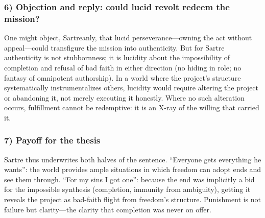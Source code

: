 \subsubsection*{6) Objection and reply: could lucid revolt redeem the mission?}

One might object, Sartreanly, that lucid perseverance—owning the act without appeal—could
transfigure the mission into authenticity. But for Sartre authenticity is not stubbornness; it
is lucidity about the impossibility of completion and refusal of bad faith in either direction
(no hiding in role; no fantasy of omnipotent authorship). In a world where the project's
structure systematically instrumentalizes others, lucidity would require altering the project or
abandoning it, not merely executing it honestly. Where no such alteration occurs, fulfillment
cannot be redemptive: it is an X-ray of the willing that carried it.

\subsubsection*{7) Payoff for the thesis}

Sartre thus underwrites both halves of the sentence. ``Everyone gets everything he wants'': the
world provides ample situations in which freedom can adopt ends and see them through. ``For my
sins I got one'': because the end was implicitly a bid for the impossible synthesis (completion,
immunity from ambiguity), getting it reveals the project as bad-faith flight from freedom's
structure. Punishment is not failure but clarity—the clarity that completion was never on offer.
